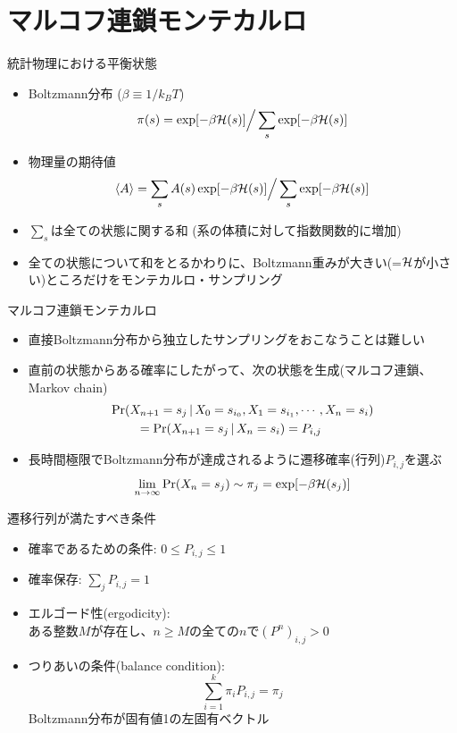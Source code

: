 \section{マルコフ連鎖モンテカルロ}

\begin{frame}[t,fragile]{統計物理における平衡状態}
  \begin{itemize}
    \setlength{\itemsep}{1em}
  \item Boltzmann分布 ($\beta \equiv 1/k_B T$)
    \[
    \pi(s) = \exp[-\beta {\cal H}(s)] \Big / \sum_s \exp[-\beta {\cal H}(s)]
    \]
  \item 物理量の期待値
    \[
    \langle A \rangle = \sum_s A(s) \exp[-\beta {\cal H}(s)] \Big/ \sum_s \exp[-\beta {\cal H}(s)]
    \]
  \item $\sum_s$は全ての状態に関する和 (系の体積に対して指数関数的に増加)
  \item 全ての状態について和をとるかわりに、Boltzmann重みが大きい(=$\cal H$が小さい)ところだけをモンテカルロ・サンプリング
  \end{itemize}
\end{frame}

\begin{frame}[t,fragile]{マルコフ連鎖モンテカルロ}
  \begin{itemize}
    \setlength{\itemsep}{1em}
  \item 直接Boltzmann分布から独立したサンプリングをおこなうことは難しい
  \item 直前の状態からある確率にしたがって、次の状態を生成(マルコフ連鎖、Markov chain)
    \[
    \begin{split}
      &{\rm Pr}(X_{n+1}=s_j \,|\, X_0 = s_{i_0}, X_1 = s_{i_1}, \cdots, X_n = s_{i}) \\
      & \qquad = {\rm Pr}(X_{n+1}=s_j \,|\, X_n = s_{i}) = P_{i,j}
      \end{split}
    \]
    \item 長時間極限でBoltzmann分布が達成されるように遷移確率(行列)$P_{i,j}$を選ぶ
      \[
      \lim_{n\rightarrow\infty}{\rm Pr}(X_n=s_j) \sim \pi_j = \exp[-\beta {\cal H}(s_j)]
      \]
  \end{itemize}
\end{frame}

\begin{frame}[t,fragile]{遷移行列が満たすべき条件}
  \begin{itemize}
    \setlength{\itemsep}{1em}
  \item 確率であるための条件: $0 \le P_{i,j} \le 1$
  \item 確率保存: $\sum_j P_{i,j} = 1$
  \item エルゴード性(ergodicity): \\
    ある整数$M$が存在し、$n \ge M$の全ての$n$で$(P^n)_{i,j} > 0$
  \item つりあいの条件(balance condition):
    \[ \sum_{i=1}^k \pi_i P_{i,j} = \pi_j \]
    Boltzmann分布が固有値1の左固有ベクトル
  \end{itemize}
\end{frame}

